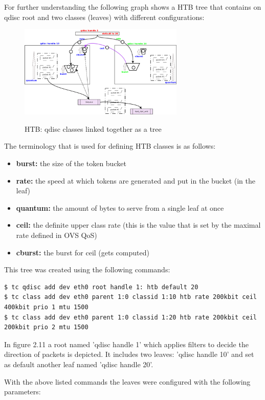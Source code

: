 For further understanding the following graph shows a HTB tree that contains on qdisc root and two classes (leaves) with different configurations:

\begin{figure}[H]
\centering
\includegraphics[width=0.7\textwidth]{images/fundamentals/htb_qdisc.png}
\caption{HTB: qdisc classes linked together as a tree} \cite{htb-qdiscs} 
\end{figure}

The terminology that is used for defining HTB classes is as follows:
\begin{itemize}
\item \textbf{burst:} the size of the token bucket
\item \textbf{rate:} the speed at which tokens are generated and put in the bucket (in the leaf)
\item \textbf{quantum:} the amount of bytes to serve from a single leaf at once
\item \textbf{ceil:} the definite upper class rate (this is the value that is set by the maximal rate defined in OVS QoS)
\item \textbf{cburst:} the burst for ceil (gets computed)
\end{itemize}

This tree was created using the following commands:
\begin{lstlisting}[language=commands]
$ tc qdisc add dev eth0 root handle 1: htb default 20
$ tc class add dev eth0 parent 1:0 classid 1:10 htb rate 200kbit ceil 400kbit prio 1 mtu 1500
$ tc class add dev eth0 parent 1:0 classid 1:20 htb rate 200kbit ceil 200kbit prio 2 mtu 1500
\end{lstlisting}

In figure 2.11 a root named 'qdisc handle 1' which applies filters to decide the direction of packets is depicted. It includes two leaves: 'qdisc handle 10' and set as default another leaf named 'qdisc handle 20'.

With the above listed commands the leaves were configured with the following parameters:

